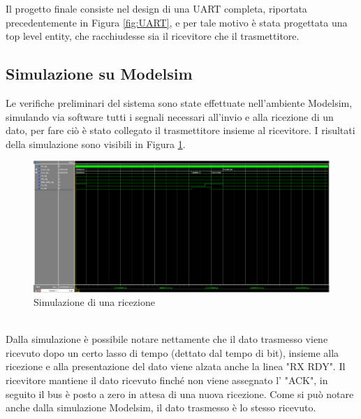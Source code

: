 \documentclass[a4paper, titlepage]{article}
\begin{document}
Il progetto finale consiste nel design di una UART completa, riportata precedentemente in Figura \ref{fig:UART}, e per tale motivo è stata progettata una top level entity, che racchiudesse sia il ricevitore che il trasmettitore.\\
\subsection{Simulazione su Modelsim}
Le verifiche preliminari del sistema sono state effettuate nell'ambiente Modelsim, simulando via software tutti i segnali necessari all'invio e alla ricezione di un dato, per fare ciò è stato collegato il trasmettitore insieme al ricevitore. I risultati della simulazione sono visibili in Figura \ref{fig:sim_rx}.
\begin{figure}[h]
    \centering
    \includegraphics[scale=0.4]{test_RX.PNG}
    \caption{Simulazione di una ricezione}
    \label{fig:sim_rx}
\end{figure}\\
Dalla simulazione è possibile notare nettamente che il dato trasmesso viene ricevuto dopo un certo lasso di tempo (dettato dal tempo di bit), insieme alla ricezione e alla presentazione del dato viene alzata anche la linea "RX \textunderscore RDY". Il ricevitore mantiene il dato ricevuto finché non viene assegnato  l' "ACK", in seguito il bus è posto a zero in attesa di una nuova ricezione. Come si può notare anche dalla simulazione Modelsim, il dato trasmesso è lo stesso ricevuto.
\end{document}

